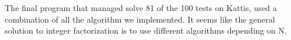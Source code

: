 The final program that managed solve 81 of the 100 tests on Kattis, used a combination of all the algorithm we implemented. It seems like the general solution to integer factorization is to use different algorithms depending on N.